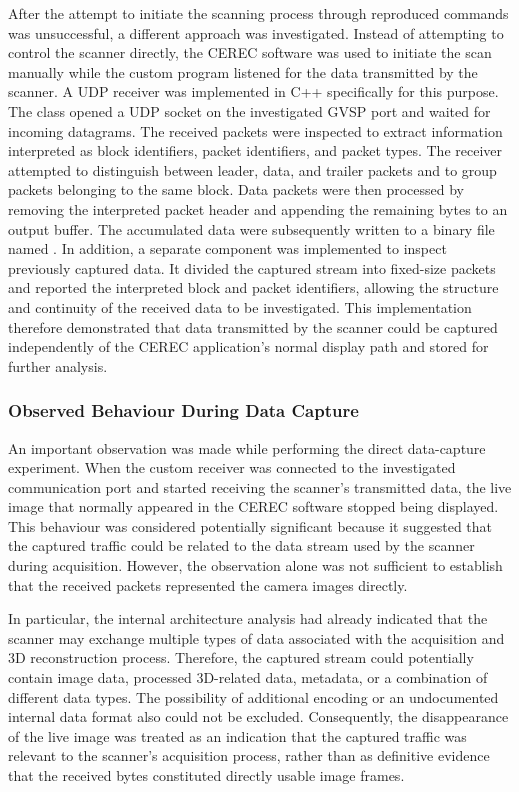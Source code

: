 After the attempt to initiate the scanning process through reproduced commands was unsuccessful, a different approach was investigated. Instead of attempting to control the scanner directly, the CEREC software was used to initiate the scan manually while the custom program listened for the data transmitted by the scanner. A UDP receiver was implemented in C++ specifically for this purpose. The  class opened a UDP socket on the investigated GVSP port and waited for incoming datagrams. The received packets were inspected to extract information interpreted as block identifiers, packet identifiers, and packet types. The receiver attempted to distinguish between leader, data, and trailer packets and to group packets belonging to the same block. Data packets were then processed by removing the interpreted packet header and appending the remaining bytes to an output buffer. The accumulated data were subsequently written to a binary file named . In addition, a separate  component was implemented to inspect previously captured data. It divided the captured stream into fixed-size packets and reported the interpreted block and packet identifiers, allowing the structure and continuity of the received data to be investigated. This implementation therefore demonstrated that data transmitted by the scanner could be captured independently of the CEREC application's normal display path and stored for further analysis.

\subsubsection{Observed Behaviour During Data Capture}

An important observation was made while performing the direct data-capture experiment. When the custom receiver was connected to the investigated communication port and started receiving the scanner's transmitted data, the live image that normally appeared in the CEREC software stopped being displayed. This behaviour was considered potentially significant because it suggested that the captured traffic could be related to the data stream used by the scanner during acquisition. However, the observation alone was not sufficient to establish that the received packets represented the camera images directly.

In particular, the internal architecture analysis had already indicated that the scanner may exchange multiple types of data associated with the acquisition and 3D reconstruction process. Therefore, the captured stream could potentially contain image data, processed 3D-related data, metadata, or a combination of different data types. The possibility of additional encoding or an undocumented internal data format also could not be excluded. Consequently, the disappearance of the live image was treated as an indication that the captured traffic was relevant to the scanner's acquisition process, rather than as definitive evidence that the received bytes constituted directly usable image frames.

